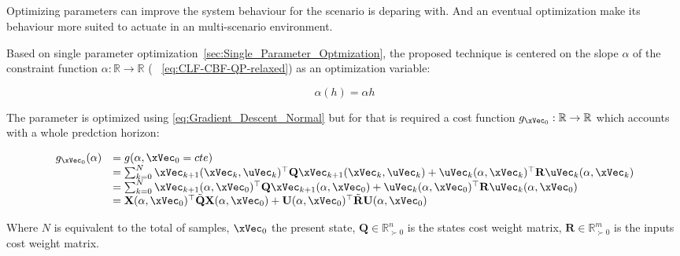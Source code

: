 \subsection{}
\label{subsec:Just_Optimized_Algorithm}

Optimizing parameters can improve the system behaviour for the scenario is deparing with. And an eventual optimization make its behaviour more suited to actuate in an multi-scenario environment. \par
Based on single parameter optimization~\ref{sec:Single_Parameter_Optmization}, the proposed technique is centered on the slope \(\alpha\) of the  constraint function \(\alpha:\mathbb{R} \to \mathbb{R}\) ( ~\ref{eq:CLF-CBF-QP-relaxed}) as an optimization variable:

\begin{equation}
    \alpha(h) = \alpha h
    \label{eq:CBF_Alpha_Formulation_AJO}
\end{equation}

The parameter is optimized using \ref{eq:Gradient_Descent_Normal} but for that is required a cost function \(g_{\xVec_0}:\mathbb{R} \to \mathbb{R}\) which accounts with a whole predction horizon:

\begin{equation}
    \begin{array}{ll}
        g_{\xVec_0}(\alpha) &= g(\alpha, \xVec_0 = cte)  \\   
        &= \sum_{k=0}^{N}\xVec_{k+1}(\xVec_k,\uVec_k)^{\top}\mathbf{Q}\xVec_{k+1}(\xVec_k,\uVec_k) +  \uVec_k(\alpha,\xVec_k)^{\top}\mathbf{R}\uVec_k(\alpha,\xVec_k) \\
        &= \sum_{k=0}^{N}\xVec_{k+1}(\alpha,\xVec_0)^{\top}\mathbf{Q}\xVec_{k+1}(\alpha,\xVec_0) +  \uVec_k(\alpha,\xVec_0)^{\top}\mathbf{R}\uVec_k(\alpha,\xVec_0) \\
        &= \mathbf{X}(\alpha,\xVec_0)^{\top}\tilde{\mathbf{Q}}\mathbf{X}(\alpha,\xVec_0) +  \mathbf{U}(\alpha,\xVec_0)^{\top}\tilde{\mathbf{R}}\mathbf{U}(\alpha,\xVec_0)
    \end{array}
    \label{eq:Cost_Function_Alpha}
\end{equation}

Where \(N\) is equivalent to the total of samples, \(\xVec_0\) the present state, \(\mathbf{Q} \in \mathbb{R}^n_{\succ 0}\) is the states cost weight matrix, \(\mathbf{R} \in \mathbb{R}^m_{\succ 0}\) is the inputs cost weight matrix.  \par

